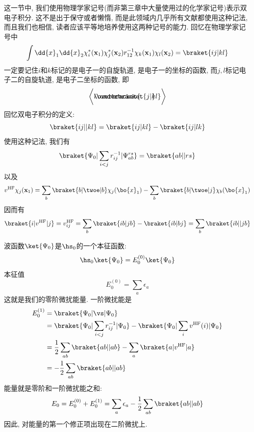 这一节中, 
我们使用物理学家记号(而非第三章中大量使用过的化学家记号)表示双电子积分. 
这不是出于保守或者懒惰, 
而是此领域内几乎所有文献都使用这种记法, 
而且我们也相信, 
读者应该平等地培养使用这两种记号的能力. 
回忆在物理学家记号中
\begin{equation}
\int\dd{x}_1\dd{x}_2 \chi_i^*(\mathbf{x}_1)\chi_j^*(\mathbf{x}_2)r_{12}^{-1}\chi_k(\mathbf{x}_1)\chi_l(\mathbf{x}_2) = \braket{ij|kl}
\end{equation}
一定要记住$i$和$k$标记的是电子一的自旋轨道, 是电子一的坐标的函数, 而$j,l$标记电子二的自旋轨道, 是电子二坐标的函数, 即
\begin{equation*}
\bigg\langle\lefteqn{\overbracket{\phantom{ij|k}}}i\underbracket{j|kl}\bigg\rangle
\end{equation*}
回忆双电子积分的定义:
\begin{equation}
\braket{ij||kl}=\braket{ij|kl}-\braket{ij|lk}
\end{equation}
使用这种记法, 
我们有
\begin{align}
\braket{\Psi_0|\sum_{i<j}r_{ij}^{-1}|\Psi_{ab}^{rs}} = \braket{ab||rs}
\end{align}
以及
\begin{align}
v^\mathrm{HF}\chi_j(\mathbf{x}_1)=\sum_b\braket{b|\twoe|b}\chi_j(\bo{x}_1) - \sum_b\braket{b|\twoe|j}\chi_{b}(\bo{x}_1)
\end{align}
因而有
\begin{align}
\braket{i|v^\mathrm{HF}|j} = v_{ij}^\mathrm{HF} = \sum_{b}\braket{ib|jb} - \braket{ib|bj} = \sum_b\braket{ib||jb}
\end{align}

\hft 波函数$\ket{\Psi_0}$是$\hs_0$的一个本征函数:
\begin{equation}
\hs_0\ket{\Psi_0} = E_0^{(0)}\ket{\Psi_0}
\end{equation}
本征值
\begin{equation}
E_0^{(0)} = \sum_a\epsilon_a
\end{equation}
这就是我们的零阶微扰能量. 
一阶微扰能是
\begin{align}
E_0^{(1)} & = \braket{\Psi_0|\vs|\Psi_0} \notag\\
          & = \braket{\Psi_0|\sum_{i<j}r_{ij}^{-1}|\Psi_0} - \braket{\Psi_0|\sum_i v^\mathrm{HF}(i)|\Psi_0} \notag \\
          & = \frac{1}{2}\sum_{ab}\braket{ab||ab} - \sum_a\braket{a|v^\mathrm{HF}|a} \notag\\
          & = -\frac{1}{2}\sum_{ab} \braket{ab||ab}
\end{align}
\hft 能量就是零阶和一阶微扰能之和:
\begin{align}
E_0 = E_0^{(0)} + E_0^{(1)} = \sum_a\epsilon_a - \frac{1}{2}\sum_{ab}\braket{ab||ab}
\end{align}
因此, 
对\hft 能量的第一个修正项出现在二阶微扰上.


